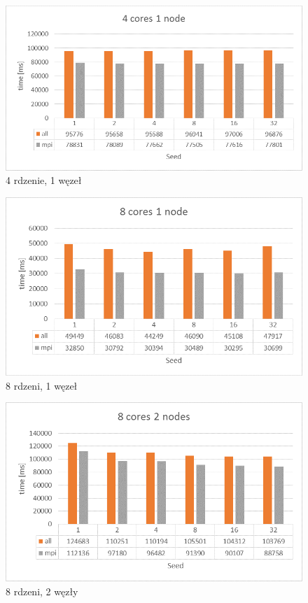 \documentclass[a4paper]{article}
\begin{document}
\begin{figure}[H]
    \centering
    \includegraphics[width=\textwidth]{1-4c1n.png}
    \caption{4 rdzenie, 1 węzeł}
    \label{fig:my_frac}
\end{figure}
\begin{figure}[H]
    \centering
    \includegraphics[width=\textwidth]{1-8c1n.png}
    \caption{8 rdzeni, 1 węzeł}
    \label{fig:my_frac}
\end{figure}
\begin{figure}[H]
    \centering
    \includegraphics[width=\textwidth]{1-8c2n.png}
    \caption{8 rdzeni, 2 węzły}
    \label{fig:my_frac}
\end{figure}
\end{document}
